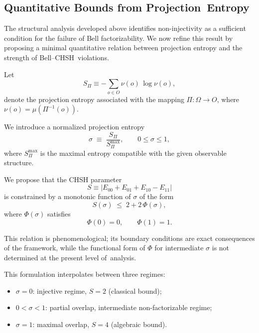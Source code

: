 \documentclass[11pt,a4paper]{article}
\theoremstyle{remark}
\begin{document}
   \subsection{Quantitative Bounds from Projection~Entropy}
  \label{subsec:projection-entropy-bound}

  The structural analysis developed above identifies non-injectivity as a sufficient
  condition for the failure of Bell factorizability.
  We now refine this result by proposing a minimal quantitative relation between
  projection entropy and the strength of Bell--CHSH~violations.

  Let
\begin{equation}
    S_{\Pi} \equiv - \sum_{o \in O} \nu(o)\,\log \nu(o),
  \end{equation}
  denote the projection entropy associated with the mapping $\Pi : \Omega \to O$,
  where $\nu(o) = \mu(\Pi^{-1}(o))$.

  We introduce a normalized projection entropy
\begin{equation}
    \sigma \;\equiv\; \frac{S_{\Pi}}{S_{\Pi}^{\max}},
    \qquad 0 \le \sigma \le 1,
  \end{equation}
  where $S_{\Pi}^{\max}$ is the maximal entropy compatible with the given observable
  structure.

  We propose that the CHSH parameter
\begin{equation}
    S \equiv |E_{00} + E_{01} + E_{10} - E_{11}|
  \end{equation}
  is constrained by a monotonic function of $\sigma$ of the form
\begin{equation}
    S(\sigma) \;\leq\; 2 + 2\,\Phi(\sigma),
    \label{eq:general-bound}
  \end{equation}
  where $\Phi(\sigma)$ satisfies
\begin{equation}
    \Phi(0) = 0, \qquad \Phi(1) = 1.
  \end{equation}

  This relation is phenomenological; its boundary conditions are exact
  consequences of the framework, while the functional form of $\Phi$ for
  intermediate $\sigma$ is not determined at the present level of~analysis.

  This formulation interpolates between three regimes:

  \begin{itemize}
    \item $\sigma = 0$: injective regime, $S = 2$ (classical bound);
    \item $0 < \sigma < 1$: partial overlap, intermediate non-factorizable regime;
    \item $\sigma = 1$: maximal overlap, $S = 4$ (algebraic bound).
  \end{itemize}
\end{document}
